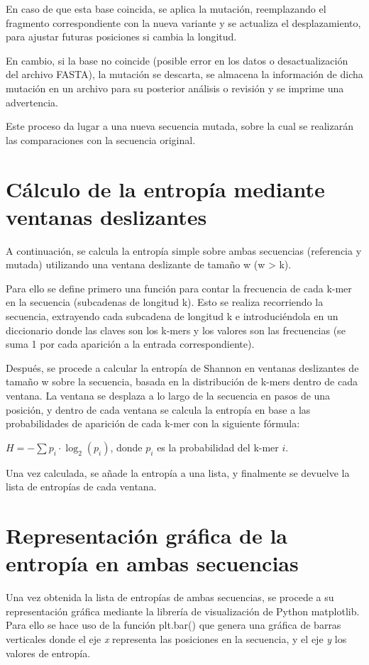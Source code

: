 \documentclass[11pt,spanish,listoffigures,listoftables]{tfgetsinf}
\begin{document}
En caso de que esta base coincida, se aplica la mutación, reemplazando el fragmento correspondiente con la nueva variante y se actualiza el desplazamiento, para ajustar futuras posiciones si cambia la longitud. 

En cambio, si la base no coincide (posible error en los datos o desactualización del archivo \acs{FASTA}), la mutación se descarta, se almacena la información de dicha mutación en un archivo para su posterior análisis o revisión y se imprime una advertencia. 

Este proceso da lugar a una nueva secuencia mutada, sobre la cual se realizarán las comparaciones con la secuencia original. 

\section{Cálculo de la entropía mediante ventanas deslizantes}

A continuación, se calcula la entropía simple sobre ambas secuencias (referencia y mutada) utilizando una ventana deslizante de tamaño w (w > k). 

Para ello se define primero una función para contar la frecuencia de cada k-mer en la secuencia (subcadenas de longitud k). Esto se realiza recorriendo la secuencia, extrayendo cada subcadena de longitud k e introduciéndola en un diccionario donde las claves son los k-mers y los valores son las frecuencias (se suma 1 por cada aparición a la entrada correspondiente).  

Después, se procede a calcular la entropía de Shannon en ventanas deslizantes de tamaño w sobre la secuencia, basada en la distribución de k-mers dentro de cada ventana. La ventana se desplaza a lo largo de la secuencia en pasos de una posición, y dentro de cada ventana se calcula la entropía en base a las probabilidades de aparición de cada k-mer con la siguiente fórmula: 

$H = -\sum p_i \cdot \log_2(p_i)$, donde $p_i$ es la probabilidad del k-mer $i$.

Una vez calculada, se añade la entropía a una lista, y finalmente se devuelve la lista de entropías de cada ventana. 

\section{Representación gráfica de la entropía en ambas secuencias}

Una vez obtenida la lista de entropías de ambas secuencias, se procede a su representación gráfica mediante la librería de visualización de Python matplotlib. Para ello se hace uso de la función plt.bar() que genera una gráfica de barras verticales donde el eje \textit{x} representa las posiciones en la secuencia, y el eje \textit{y} los valores de entropía.
\end{document}

